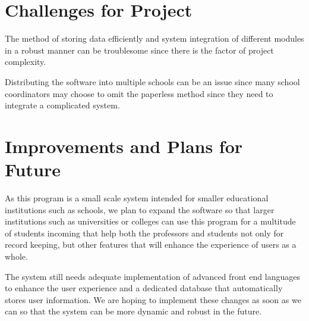 \documentclass[a4paper,12pt]{article}
\begin{document}
\section{Challenges for Project}
\enlargethispage{\baselineskip}
The method of storing data efficiently and system integration of different modules in a robust manner can be troublesome since there is the factor of project complexity.
\par
Distributing the software into multiple schools can be an issue since many school coordinators may choose to omit the paperless method since they need to integrate a complicated system. 

\section{Improvements and Plans for Future}
\enlargethispage{\baselineskip}
As this program is a small scale system intended for smaller educational institutions such as schools, we plan to expand the software so that larger institutions such as universities or colleges can use this program for a multitude of students incoming that help both the professors and students not only for record keeping, but other features that will enhance the experience of users as a whole. \par The system still needs adequate implementation of advanced front end languages to enhance the user experience and a dedicated database that automatically stores user information. We are hoping to implement these changes as soon as we can so that the system can be more dynamic and robust in the future.
\\ \\
\end{document}
